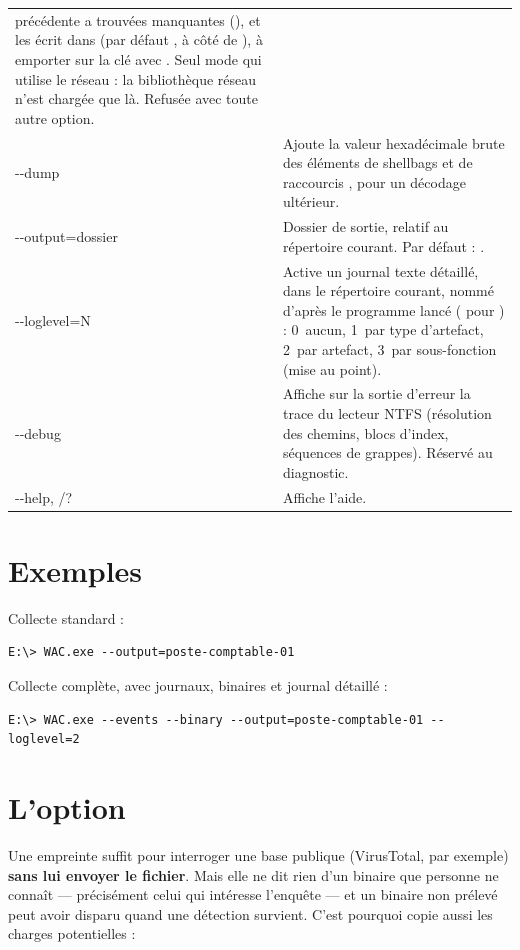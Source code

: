 \documentclass[11pt,a4paper,oneside]{report}
\begin{document}
\begin{longtable}{@{}>{\ttfamily}L{3.2cm}L{11.2cm}@{}}
  précédente a trouvées manquantes (), et les écrit dans  (par
  défaut , à côté de ), à emporter sur la clé
  avec . Seul mode qui utilise le réseau : la bibliothèque
  réseau n'est chargée que là. Refusée avec toute autre option. \\
-{}-dump & Ajoute la valeur hexadécimale brute des éléments de shellbags et de
  raccourcis , pour un décodage ultérieur. \\
-{}-output=dossier & Dossier de sortie, relatif au répertoire courant. Par défaut :
  . \\
-{}-loglevel=N & Active un journal texte détaillé, dans le répertoire courant,
  nommé d'après le programme lancé ( pour ) : 0~aucun, 1~par type
  d'artefact, 2~par artefact, 3~par sous-fonction (mise au point). \\
-{}-debug & Affiche sur la sortie d'erreur la trace du lecteur NTFS (résolution
  des chemins, blocs d'index, séquences de grappes). Réservé au diagnostic. \\
-{}-help, /? & Affiche l'aide. \\
\bottomrule
\end{longtable}

\section{Exemples}

Collecte standard :
\begin{lstlisting}
E:\> WAC.exe --output=poste-comptable-01
\end{lstlisting}

Collecte complète, avec journaux, binaires et journal détaillé :
\begin{lstlisting}
E:\> WAC.exe --events --binary --output=poste-comptable-01 --loglevel=2
\end{lstlisting}

\section{L'option }\label{sec:binary}

Une empreinte suffit pour interroger une base publique (VirusTotal, par exemple)
\textbf{sans lui envoyer le fichier}. Mais elle ne dit rien d'un binaire que
personne ne connaît — précisément celui qui intéresse l'enquête — et un binaire
non prélevé peut avoir disparu quand une détection survient. C'est pourquoi
 copie aussi les charges potentielles :
\end{document}
